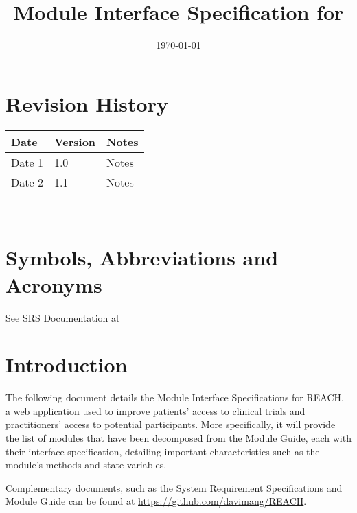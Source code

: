 \documentclass[12pt, titlepage]{article}
\begin{document}
\title{Module Interface Specification for \progname{}}

\author{\authname}

\date{\today}

\maketitle


\section{Revision History}

\begin{tabularx}{\textwidth}{p{3cm}p{2cm}X}
\toprule {\bf Date} & {\bf Version} & {\bf Notes}\\
\midrule
Date 1 & 1.0 & Notes\\
Date 2 & 1.1 & Notes\\
\bottomrule
\end{tabularx}

~\newpage

\section{Symbols, Abbreviations and Acronyms}

See SRS Documentation at 


\newpage

\tableofcontents

\newpage


\section{Introduction}

The following document details the Module Interface Specifications for
REACH, a web application used to improve patients' access to clinical 
trials and practitioners' access to potential participants. More specifically,
it will provide the list of modules that have been decomposed from the Module Guide,
each with their interface specification, detailing important characteristics such as 
the module's methods and state variables.

Complementary documents, such as the System Requirement Specifications
and Module Guide can be found at \url{https://github.com/davimang/REACH}.
\end{document}
